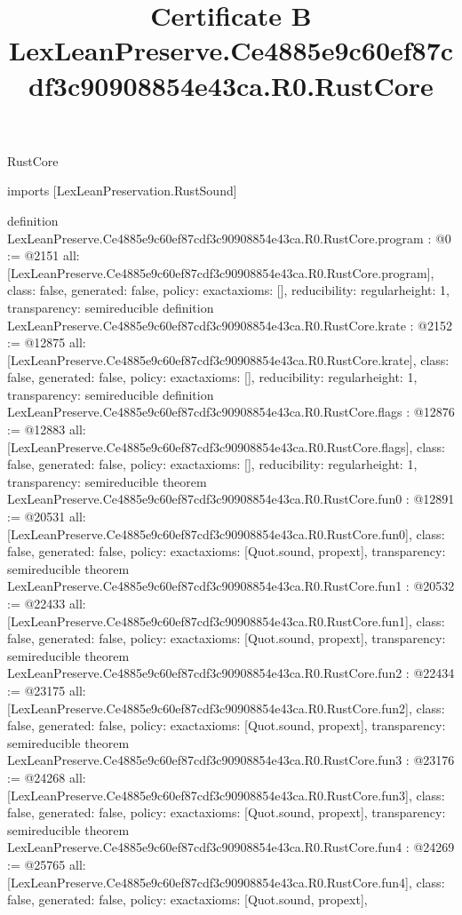 \begin{lexlean}{RustCore}
\title{Certificate B LexLeanPreserve.Ce4885e9c60ef87cdf3c90908854e43ca.R0.RustCore}
\begin{coremodule}
imports [LexLeanPreservation.RustSound]

definition LexLeanPreserve.Ce4885e9c60ef87cdf3c90908854e43ca.R0.RustCore.program : @0 := @2151 {
  all: [LexLeanPreserve.Ce4885e9c60ef87cdf3c90908854e43ca.R0.RustCore.program],
  class: false,
  generated: false,
  policy: exact{axioms: []},
  reducibility: regular{height: 1},
  transparency: semireducible
}
definition LexLeanPreserve.Ce4885e9c60ef87cdf3c90908854e43ca.R0.RustCore.krate : @2152 := @12875 {
  all: [LexLeanPreserve.Ce4885e9c60ef87cdf3c90908854e43ca.R0.RustCore.krate],
  class: false,
  generated: false,
  policy: exact{axioms: []},
  reducibility: regular{height: 1},
  transparency: semireducible
}
definition LexLeanPreserve.Ce4885e9c60ef87cdf3c90908854e43ca.R0.RustCore.flags : @12876 := @12883 {
  all: [LexLeanPreserve.Ce4885e9c60ef87cdf3c90908854e43ca.R0.RustCore.flags],
  class: false,
  generated: false,
  policy: exact{axioms: []},
  reducibility: regular{height: 1},
  transparency: semireducible
}
theorem LexLeanPreserve.Ce4885e9c60ef87cdf3c90908854e43ca.R0.RustCore.fun0 : @12891 := @20531 {
  all: [LexLeanPreserve.Ce4885e9c60ef87cdf3c90908854e43ca.R0.RustCore.fun0],
  class: false,
  generated: false,
  policy: exact{axioms: [Quot.sound, propext]},
  transparency: semireducible
}
theorem LexLeanPreserve.Ce4885e9c60ef87cdf3c90908854e43ca.R0.RustCore.fun1 : @20532 := @22433 {
  all: [LexLeanPreserve.Ce4885e9c60ef87cdf3c90908854e43ca.R0.RustCore.fun1],
  class: false,
  generated: false,
  policy: exact{axioms: [Quot.sound, propext]},
  transparency: semireducible
}
theorem LexLeanPreserve.Ce4885e9c60ef87cdf3c90908854e43ca.R0.RustCore.fun2 : @22434 := @23175 {
  all: [LexLeanPreserve.Ce4885e9c60ef87cdf3c90908854e43ca.R0.RustCore.fun2],
  class: false,
  generated: false,
  policy: exact{axioms: [Quot.sound, propext]},
  transparency: semireducible
}
theorem LexLeanPreserve.Ce4885e9c60ef87cdf3c90908854e43ca.R0.RustCore.fun3 : @23176 := @24268 {
  all: [LexLeanPreserve.Ce4885e9c60ef87cdf3c90908854e43ca.R0.RustCore.fun3],
  class: false,
  generated: false,
  policy: exact{axioms: [Quot.sound, propext]},
  transparency: semireducible
}
theorem LexLeanPreserve.Ce4885e9c60ef87cdf3c90908854e43ca.R0.RustCore.fun4 : @24269 := @25765 {
  all: [LexLeanPreserve.Ce4885e9c60ef87cdf3c90908854e43ca.R0.RustCore.fun4],
  class: false,
  generated: false,
  policy: exact{axioms: [Quot.sound, propext]},
}
\end{coremodule}
\end{lexlean}
